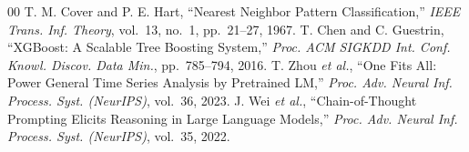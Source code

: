 \documentclass[conference]{IEEEtran}
\begin{document}
\begin{thebibliography}{00}
 T. M. Cover and P. E. Hart, ``Nearest Neighbor Pattern Classification,'' \textit{IEEE Trans. Inf. Theory}, vol.~13, no.~1, pp.~21--27, 1967.
 T. Chen and C. Guestrin, ``XGBoost: A Scalable Tree Boosting System,'' \textit{Proc. ACM SIGKDD Int. Conf. Knowl. Discov. Data Min.}, pp.~785--794, 2016.
 T. Zhou \textit{et al.}, ``One Fits All: Power General Time Series Analysis by Pretrained LM,'' \textit{Proc. Adv. Neural Inf. Process. Syst. (NeurIPS)}, vol.~36, 2023.
 J. Wei \textit{et al.}, ``Chain-of-Thought Prompting Elicits Reasoning in Large Language Models,'' \textit{Proc. Adv. Neural Inf. Process. Syst. (NeurIPS)}, vol.~35, 2022.
\end{thebibliography}
\end{document}
